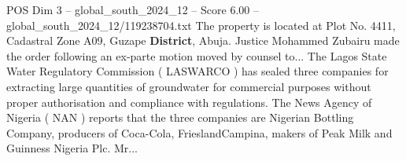 \begin{textsample}{POS Dim 3 – global\_south\_2024\_12 – Score 6.00 – global\_south\_2024\_12/119238704.txt}
The property is located at Plot No. 4411, Cadastral Zone A09, Guzape \textbf{District}, Abuja.
Justice Mohammed Zubairu made the order following an ex-parte motion moved by counsel to...
The Lagos State Water Regulatory Commission ( LASWARCO ) has sealed three companies for extracting large quantities of groundwater for commercial purposes without proper authorisation and compliance with regulations.
The News Agency of Nigeria ( NAN ) reports that the three companies are Nigerian Bottling Company, producers of Coca-Cola, FrieslandCampina, makers of Peak Milk and Guinness Nigeria Plc.
Mr...

\end{textsample}
